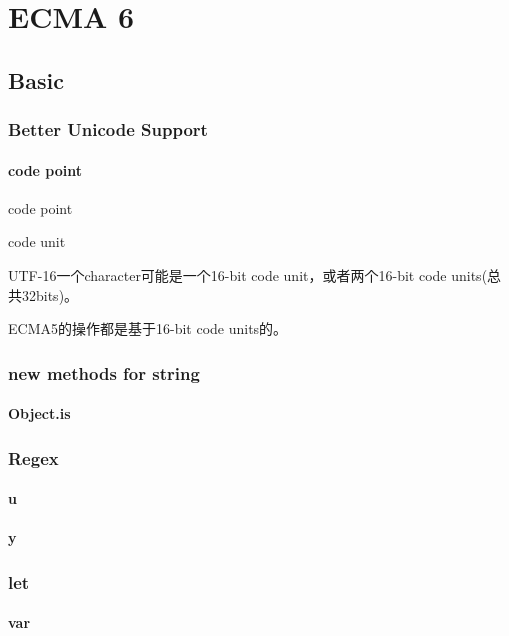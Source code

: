 \chapter{ECMA 6}

\section{Basic}

\subsection{Better Unicode Support}

\subsubsection{code point}
code point

code unit

UTF-16一个character可能是一个16-bit code unit，或者两个16-bit code units(总共32bits)。

ECMA5的操作都是基于16-bit code units的。


\subsection{new methods for string}

\subsubsection{Object.is}

\subsection{Regex}

\subsubsection{u}

\subsubsection{y}

\subsection{let}

\subsubsection{var}

